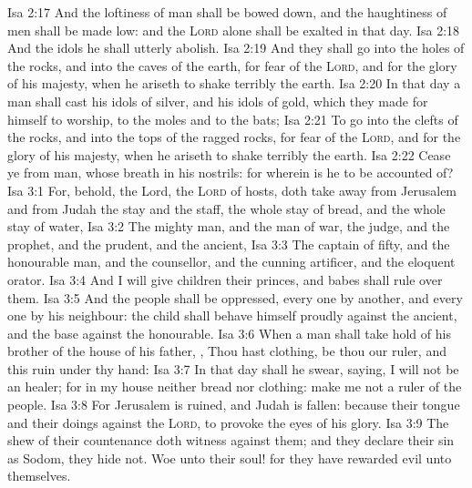 \vs Isa 2:17 And the loftiness of man shall be bowed down, and the haughtiness of men shall be made low: and the \textsc{Lord} alone shall be exalted in that day.
\vs Isa 2:18 And the idols he shall utterly abolish.
\vs Isa 2:19 And they shall go into the holes of the rocks, and into the caves of the earth, for fear of the \textsc{Lord}, and for the glory of his majesty, when he ariseth to shake terribly the earth.
\vs Isa 2:20 In that day a man shall cast his idols of silver, and his idols of gold, which they made  for himself to worship, to the moles and to the bats;
\vs Isa 2:21 To go into the clefts of the rocks, and into the tops of the ragged rocks, for fear of the \textsc{Lord}, and for the glory of his majesty, when he ariseth to shake terribly the earth.
\vs Isa 2:22 Cease ye from man, whose breath  in his nostrils: for wherein is he to be accounted of?
\vs Isa 3:1 For, behold, the Lord, the \textsc{Lord} of hosts, doth take away from Jerusalem and from Judah the stay and the staff, the whole stay of bread, and the whole stay of water,
\vs Isa 3:2 The mighty man, and the man of war, the judge, and the prophet, and the prudent, and the ancient,
\vs Isa 3:3 The captain of fifty, and the honourable man, and the counsellor, and the cunning artificer, and the eloquent orator.
\vs Isa 3:4 And I will give children  their princes, and babes shall rule over them.
\vs Isa 3:5 And the people shall be oppressed, every one by another, and every one by his neighbour: the child shall behave himself proudly against the ancient, and the base against the honourable.
\vs Isa 3:6 When a man shall take hold of his brother of the house of his father, , Thou hast clothing, be thou our ruler, and  this ruin  under thy hand:
\vs Isa 3:7 In that day shall he swear, saying, I will not be an healer; for in my house  neither bread nor clothing: make me not a ruler of the people.
\vs Isa 3:8 For Jerusalem is ruined, and Judah is fallen: because their tongue and their doings  against the \textsc{Lord}, to provoke the eyes of his glory.
\vs Isa 3:9 The shew of their countenance doth witness against them; and they declare their sin as Sodom, they hide  not. Woe unto their soul! for they have rewarded evil unto themselves.
